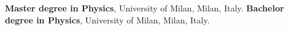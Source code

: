 %
%
%


\begin{scholarship}
					{\textbf{Master degree in Physics}, University of Milan, Milan, Italy.}
					{\textbf{Bachelor degree in Physics}, University of Milan, Milan, Italy.}
\end{scholarship}

\vspace{0.2cm}